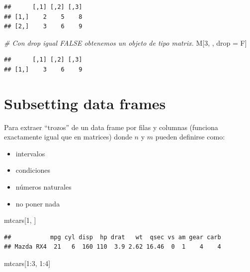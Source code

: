\documentclass[
  12pt,
]{book}
\newenvironment{Shaded}{\begin{snugshade}}{\end{snugshade}}
\newcommand{\CommentTok}[1]{\textcolor[rgb]{0.56,0.35,0.01}{\textit{#1}}}
\newcommand{\DecValTok}[1]{\textcolor[rgb]{0.00,0.00,0.81}{#1}}
\newcommand{\NormalTok}[1]{#1}
\newcommand{\OtherTok}[1]{\textcolor[rgb]{0.56,0.35,0.01}{#1}}
\newcommand{\SpecialCharTok}[1]{\textcolor[rgb]{0.00,0.00,0.00}{#1}}
\providecommand{\tightlist}{%
  \setlength{\itemsep}{0pt}\setlength{\parskip}{0pt}}
\begin{document}
\begin{verbatim}
##      [,1] [,2] [,3]
## [1,]    2    5    8
## [2,]    3    6    9
\end{verbatim}

\begin{Shaded}
\begin{Highlighting}[]
\CommentTok{\# Con drop igual FALSE obtenemos un objeto de tipo matrix.}
\NormalTok{M[}\DecValTok{3}\NormalTok{, , drop }\OtherTok{=}\NormalTok{ F]}
\end{Highlighting}
\end{Shaded}

\begin{verbatim}
##      [,1] [,2] [,3]
## [1,]    3    6    9
\end{verbatim}

\hypertarget{subsetting-data-frames}{%
\section{\texorpdfstring{\textbf{Subsetting data frames}}{Subsetting data frames}}\label{subsetting-data-frames}}

Para extraer ``trozos'' de un data frame por filas y columnas (funciona exactamente igual que en matrices) donde \(n\) y \(m\) pueden definirse como:

\begin{itemize}
\tightlist
\item
  intervalos
\item
  condiciones
\item
  números naturales
\item
  no poner nada
\end{itemize}

\begin{Shaded}
\begin{Highlighting}[]
\NormalTok{mtcars[}\DecValTok{1}\NormalTok{, ]}
\end{Highlighting}
\end{Shaded}

\begin{verbatim}
##           mpg cyl disp  hp drat   wt  qsec vs am gear carb
## Mazda RX4  21   6  160 110  3.9 2.62 16.46  0  1    4    4
\end{verbatim}

\begin{Shaded}
\begin{Highlighting}[]
\NormalTok{mtcars[}\DecValTok{1}\SpecialCharTok{:}\DecValTok{3}\NormalTok{, }\DecValTok{1}\SpecialCharTok{:}\DecValTok{4}\NormalTok{]}
\end{Highlighting}
\end{Shaded}
\end{document}

